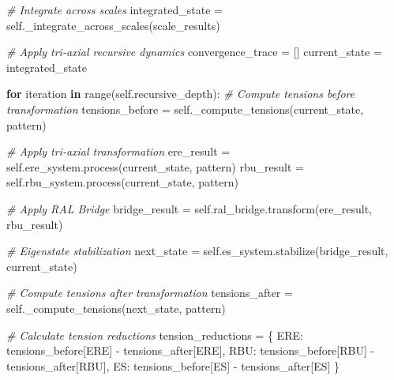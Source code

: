 \documentclass[
]{article}
\newenvironment{Shaded}{}{}
\newcommand{\BuiltInTok}[1]{\textcolor[rgb]{0.00,0.50,0.00}{#1}}
\newcommand{\CommentTok}[1]{\textcolor[rgb]{0.38,0.63,0.69}{\textit{#1}}}
\newcommand{\ControlFlowTok}[1]{\textcolor[rgb]{0.00,0.44,0.13}{\textbf{#1}}}
\newcommand{\KeywordTok}[1]{\textcolor[rgb]{0.00,0.44,0.13}{\textbf{#1}}}
\newcommand{\NormalTok}[1]{#1}
\newcommand{\OperatorTok}[1]{\textcolor[rgb]{0.40,0.40,0.40}{#1}}
\newcommand{\StringTok}[1]{\textcolor[rgb]{0.25,0.44,0.63}{#1}}
\newcommand{\VariableTok}[1]{\textcolor[rgb]{0.10,0.09,0.49}{#1}}
\begin{document}
\begin{Shaded}
\begin{Highlighting}[]
        \CommentTok{\# Integrate across scales}
\NormalTok{        integrated\_state }\OperatorTok{=} \VariableTok{self}\NormalTok{.\_integrate\_across\_scales(scale\_results)}

        \CommentTok{\# Apply tri{-}axial recursive dynamics}
\NormalTok{        convergence\_trace }\OperatorTok{=}\NormalTok{ []}
\NormalTok{        current\_state }\OperatorTok{=}\NormalTok{ integrated\_state}

        \ControlFlowTok{for}\NormalTok{ iteration }\KeywordTok{in} \BuiltInTok{range}\NormalTok{(}\VariableTok{self}\NormalTok{.recursive\_depth):}
            \CommentTok{\# Compute tensions before transformation}
\NormalTok{            tensions\_before }\OperatorTok{=} \VariableTok{self}\NormalTok{.\_compute\_tensions(current\_state, pattern)}

            \CommentTok{\# Apply tri{-}axial transformation}
\NormalTok{            ere\_result }\OperatorTok{=} \VariableTok{self}\NormalTok{.ere\_system.process(current\_state, pattern)}
\NormalTok{            rbu\_result }\OperatorTok{=} \VariableTok{self}\NormalTok{.rbu\_system.process(current\_state, pattern)}

            \CommentTok{\# Apply RAL Bridge}
\NormalTok{            bridge\_result }\OperatorTok{=} \VariableTok{self}\NormalTok{.ral\_bridge.transform(ere\_result, rbu\_result)}

            \CommentTok{\# Eigenstate stabilization}
\NormalTok{            next\_state }\OperatorTok{=} \VariableTok{self}\NormalTok{.es\_system.stabilize(bridge\_result, current\_state)}

            \CommentTok{\# Compute tensions after transformation}
\NormalTok{            tensions\_after }\OperatorTok{=} \VariableTok{self}\NormalTok{.\_compute\_tensions(next\_state, pattern)}

            \CommentTok{\# Calculate tension reductions}
\NormalTok{            tension\_reductions }\OperatorTok{=}\NormalTok{ \{}
                \StringTok{\textquotesingle{}ERE\textquotesingle{}}\NormalTok{: tensions\_before[}\StringTok{\textquotesingle{}ERE\textquotesingle{}}\NormalTok{] }\OperatorTok{{-}}\NormalTok{ tensions\_after[}\StringTok{\textquotesingle{}ERE\textquotesingle{}}\NormalTok{],}
                \StringTok{\textquotesingle{}RBU\textquotesingle{}}\NormalTok{: tensions\_before[}\StringTok{\textquotesingle{}RBU\textquotesingle{}}\NormalTok{] }\OperatorTok{{-}}\NormalTok{ tensions\_after[}\StringTok{\textquotesingle{}RBU\textquotesingle{}}\NormalTok{],}
                \StringTok{\textquotesingle{}ES\textquotesingle{}}\NormalTok{: tensions\_before[}\StringTok{\textquotesingle{}ES\textquotesingle{}}\NormalTok{] }\OperatorTok{{-}}\NormalTok{ tensions\_after[}\StringTok{\textquotesingle{}ES\textquotesingle{}}\NormalTok{]}
\NormalTok{            \}}


\end{Highlighting}
\end{Shaded}
\end{document}
